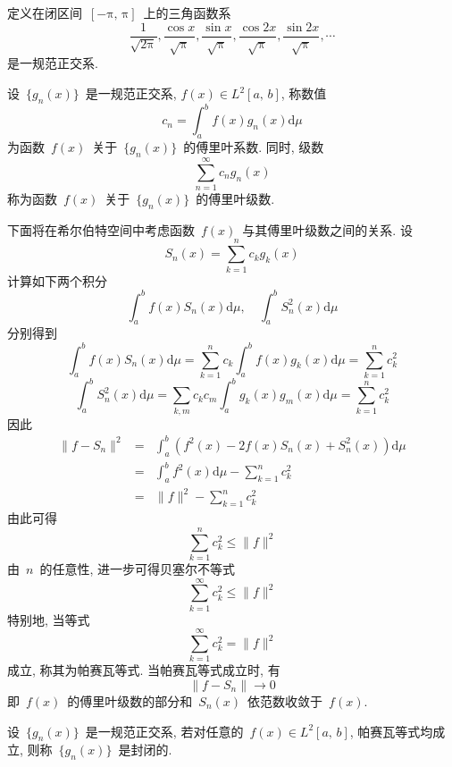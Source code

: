 \begin{Example}
定义在闭区间~$[-\mathrm{\pi},\,\mathrm{\pi}]$~上的三角函数系
\[
\frac{1}{\sqrt{2\mathrm{\pi}}}, \frac{\cos x}{\sqrt{\mathrm{\pi}}}, \frac{\sin x}{\sqrt{\mathrm{\pi}}}, \frac{\cos 2x}{\sqrt{\mathrm{\pi}}}, \frac{\sin 2x}{\sqrt{\mathrm{\pi}}}, \cdots
\]
是一规范正交系.
\end{Example}


\begin{Definition}\label{Def-6-9}

设~$\{g_{n}(x)\}$~是一规范正交系, $f(x)\in L^2[a,\,b]$, 称数值
\[
c_{n}=\int_{a}^{b}f(x)g_{n}(x)\mathrm{d}\mu
\]
为函数~$f(x)$~关于~$\{g_{n}(x)\}$~的傅里叶系数. 同时, 级数
\[
\sum_{n=1}^{\infty}c_{n}g_{n}(x)
\]
称为函数~$f(x)$~关于~$\{g_{n}(x)\}$~的傅里叶级数.
\end{Definition}

下面将在希尔伯特空间中考虑函数~$f(x)$~与其傅里叶级数之间的关系. 设
\[
S_{n}(x)=\sum_{k=1}^{n}c_{k}g_{k}(x)
\]
计算如下两个积分
\[
\int_{a}^{b}f(x)S_{n}(x)\mathrm{d}\mu,\quad \int_{a}^{b}S_{n}^{2}(x)\mathrm{d}\mu
\]
分别得到
\[
\int_{a}^{b}f(x)S_{n}(x)\mathrm{d}\mu=\sum_{k=1}^{n}c_{k}\int_{a}^{b}f(x)g_{k}(x)\mathrm{d}\mu=\sum_{k=1}^{n}c_{k}^{2}
\]
\[
\int_{a}^{b}S_{n}^{2}(x)\mathrm{d}\mu=\sum_{k,m}c_{k}c_{m}\int_{a}^{b}g_{k}(x)g_{m}(x)\mathrm{d}\mu=\sum_{k=1}^{n}c_{k}^{2}
\]
因此
\begin{eqnarray*}
\|f-S_{n}\|^{2}&=&\int_{a}^{b}(f^{2}(x)-2f(x)S_{n}(x)+S_{n}^{2}(x))\mathrm{d}\mu\\
&=&\int_{a}^{b}f^{2}(x)\mathrm{d}\mu-\sum_{k=1}^{n}c_{k}^{2}\\
&=&\|f\|^{2}-\sum_{k=1}^{n}c_{k}^{2}
\end{eqnarray*}
由此可得
\[
\sum_{k=1}^{n}c_{k}^{2}\leqslant \|f\|^{2}
\]
由~$n$~的任意性, 进一步可得贝塞尔不等式
\[
\sum_{k=1}^{\infty}c_{k}^{2}\leqslant \|f\|^{2}
\]
特别地, 当等式
\[
\sum_{k=1}^{\infty}c_{k}^{2}= \|f\|^{2}
\]
成立, 称其为帕赛瓦等式. 当帕赛瓦等式成立时, 有
\[
\|f-S_{n}\|\rightarrow 0
\]
即~$f(x)$~的傅里叶级数的部分和~$S_{n}(x)$~依范数收敛于~$f(x)$.


\begin{Definition}\label{Def-6-10}
设~$\{g_{n}(x)\}$~是一规范正交系, 若对任意的~$f(x)\in L^2[a,\,b]$, 帕赛瓦等式均成立, 则称~$\{g_{n}(x)\}$~是封闭的.
\end{Definition}


